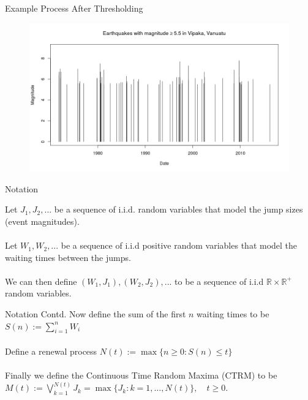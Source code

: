 \documentclass{beamer}
\begin{document}
\begin{frame}{Example Process After Thresholding}
    \begin{figure}
        \hspace{-0.8cm}
        \includegraphics[scale=0.45]{ThresholdedEQData.jpeg}
    \end{figure}
\end{frame}
 
\begin{frame}{Notation}
	
	Let $J_1 , J_2 , ...$ be a sequence of i.i.d. random variables that model the jump sizes (event magnitudes).
	\\~\\
	Let $W_1, W_2, ...$ be a sequence of i.i.d positive random variables that model the waiting times between the jumps.
	\\~\\
	We can then define $(W_1 , J_1 ), (W_2 , J_2 ), ...$ to be a sequence of i.i.d $\mathbb{R} \times \mathbb{R} ^+$ random variables.
\end{frame}

\begin{frame}{Notation Contd.}
    Now define the sum of the first $n$ waiting times to be $S(n):=\sum^n_{i=1} W_i$
    \\~\\
    Define a renewal process $N(t):=\max\{n\geq0:S(n)\leq t\}$
    \\~\\
    Finally we define the Continuous Time Random Maxima (CTRM) to be $M(t) := \bigvee_{k=1}^{N(t)} J_k
= \max\{J_k: k = 1, \ldots, N(t)\}, \quad t \ge 0.$
\end{frame}
\end{document}
